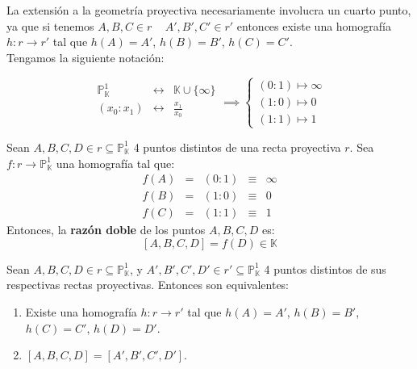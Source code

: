 La extensión a la geometría proyectiva necesariamente involucra un cuarto punto, ya que si tenemos $A,B,C \in r \, \quad A',B',C' \in r'$ entonces existe una homografía $h: r \to r'$ tal que $h(A) = A'$, $h(B) = B'$, $h(C) = C'$.\\

Tengamos la siguiente notación:

\[
\begin{array}{ccc}
    \mathbb{P}_{\mathbb{K}}^1 & \longleftrightarrow & \mathbb{K} \cup \{\infty\} \\
    (x_0 : x_1) & \longleftrightarrow & \frac{x_1}{x_0} \\
\end{array}
\implies
\begin{cases}
    (0:1) \mapsto \infty \\
    (1:0) \mapsto 0 \\
    (1:1) \mapsto 1
\end{cases}
\]

\begin{definición}
    Sean $A,B,C,D \in r \subseteq \mathbb{P}^1_{\mathbb{K}}$ 4 puntos distintos de una recta proyectiva $r$. Sea $f: r \to \mathbb{P}^1_{\mathbb{K}}$ una homografía tal que:
    \[
    \begin{array}{ccccc}
        f(A) & = & (0:1) & \equiv & \infty \\
        f(B) & = & (1:0) & \equiv & 0 \\
        f(C) & = & (1:1) & \equiv & 1
    \end{array}
    \]
    Entonces, la \textbf{razón doble} de los puntos $A,B,C,D$ es:
    \[
    \left[ A, B, C, D \right] = f(D) \in \mathbb{K}
    \]
\end{definición}

\begin{teorema}
    Sean $A,B,C,D \in r \subseteq \mathbb{P}^1_{\mathbb{K}}$, y $A',B',C',D' \in r' \subseteq \mathbb{P}^1_{\mathbb{K}}$ 4 puntos distintos de sus respectivas rectas proyectivas. Entonces son equivalentes:
    \begin{enumerate}
        \item Existe una homografía $h: r \to r'$ tal que $h(A) = A'$, $h(B) = B'$, $h(C) = C'$, $h(D) = D'$.
        \item $\left[ A, B, C, D \right] = \left[ A', B', C', D' \right]$.
    \end{enumerate}
\end{teorema}

